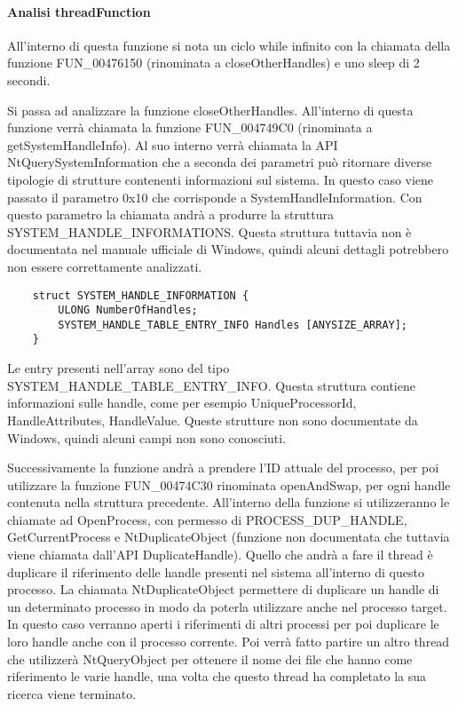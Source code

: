 \documentclass[a4paper,12pt]{article}
\begin{document}
\paragraph{Analisi threadFunction}
All'interno di questa funzione si nota un ciclo while infinito con la chiamata della funzione FUN\_00476150 (rinominata a closeOtherHandles) e uno sleep di 2 secondi.

Si passa ad analizzare la funzione closeOtherHandles. All'interno di questa funzione verrà chiamata la funzione FUN\_004749C0 (rinominata a getSystemHandleInfo). Al suo interno verrà chiamata la API NtQuerySystemInformation che a seconda dei parametri può ritornare diverse tipologie di strutture contenenti informazioni sul sistema. In questo caso viene passato il parametro 0x10 che corrisponde a SystemHandleInformation. Con questo parametro la chiamata andrà a produrre la struttura \\SYSTEM\_HANDLE\_INFORMATIONS. Questa struttura tuttavia non è documentata nel manuale ufficiale di Windows, quindi alcuni dettagli potrebbero non essere correttamente analizzati.
\begin{verbatim}
	struct SYSTEM_HANDLE_INFORMATION {
		ULONG NumberOfHandles;
		SYSTEM_HANDLE_TABLE_ENTRY_INFO Handles [ANYSIZE_ARRAY];
	}
\end{verbatim}

Le entry presenti nell'array sono del tipo \\SYSTEM\_HANDLE\_TABLE\_ENTRY\_INFO. Questa struttura contiene informazioni sulle handle, come per esempio UniqueProcessorId, HandleAttributes, HandleValue. Queste strutture non sono documentate da Windows, quindi alcuni campi non sono conosciuti. 

Successivamente la funzione andrà a prendere l'ID attuale del processo, per poi utilizzare la funzione FUN\_00474C30 rinominata openAndSwap, per ogni handle contenuta nella struttura precedente. All'interno della funzione si utilizzeranno le chiamate ad OpenProcess, con permesso di PROCESS\_DUP\_HANDLE, GetCurrentProcess e NtDuplicateObject (funzione non documentata che tuttavia viene chiamata dall'API DuplicateHandle). Quello che andrà a fare il thread è duplicare il riferimento delle handle presenti nel sistema all'interno di questo processo. La chiamata NtDuplicateObject permettere di duplicare un handle di un determinato processo in modo da poterla utilizzare anche nel processo target. In questo caso verranno aperti i riferimenti di altri processi per poi duplicare le loro handle anche con il processo corrente.  Poi verrà fatto partire un altro thread che utilizzerà NtQueryObject per ottenere il nome dei file che hanno come riferimento le varie handle, una volta che questo thread ha completato la sua ricerca viene terminato.
\end{document}
